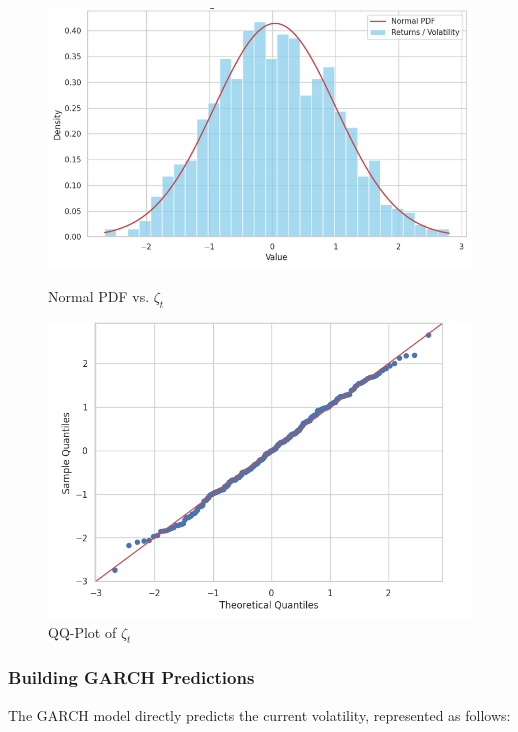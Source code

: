 \begin{figure}[ht]
    \centering
    \begin{minipage}{0.5\textwidth}
        \centering
        \includegraphics[width=\linewidth]{img/normal.png} %
        \caption{Normal PDF vs. \(\zeta_t\)}
        \label{fig:normal}
    \end{minipage}
    \hfill
    \begin{minipage}{0.44\textwidth}
        \centering
        \includegraphics[width=\linewidth]{img/qq.png} %
        \caption{QQ-Plot of \(\zeta_t\)}
        \label{fig:qq}
    \end{minipage}
\end{figure}



\subsubsection{Building GARCH Predictions}
The GARCH model directly predicts the current volatility, represented as follows:

